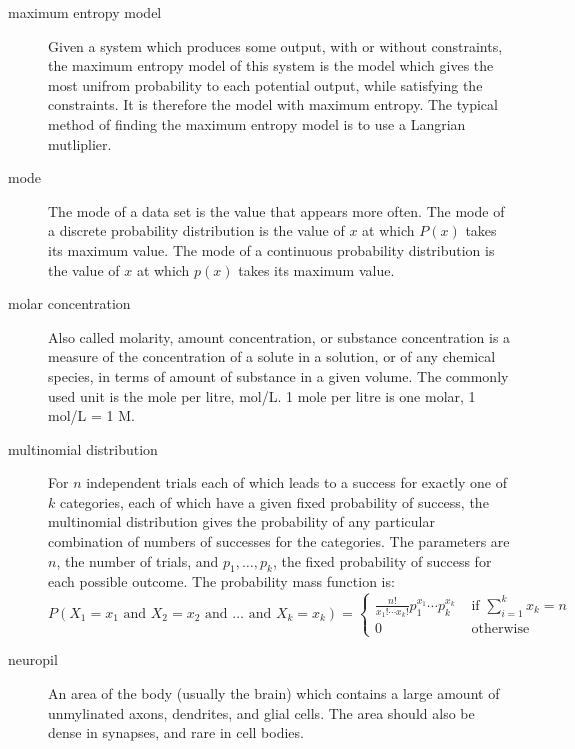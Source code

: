 \documentclass[a4paper,12pt]{article}
\theoremstyle{definition}
\begin{document}
\begin{description}
  \item[maximum entropy model] Given a system which produces some output, with or without constraints, the maximum entropy model of this system is the model which gives the most unifrom probability to each potential output, while satisfying the constraints. It is therefore the model with maximum entropy. The typical method of finding the maximum entropy model is to use a Langrian mutliplier.

  \item[mode] The mode of a data set is the value that appears more often. The mode of a discrete probability distribution is the value of $x$ at which $P(x)$ takes its maximum value. The mode of a continuous probability distribution is the value of $x$ at which $p(x)$ takes its maximum value.

  \item[molar concentration] Also called molarity, amount concentration, or substance concentration is a measure of the concentration of a solute in a solution, or of any chemical species, in terms of amount of substance in a given volume. The commonly used unit is the mole per litre, mol/L. 1 mole per litre is one molar, 1 mol/L = 1 M.

  \item[multinomial distribution] For $n$ independent trials each of which leads to a success for exactly one of $k$ categories, each of which have a given fixed probability of success, the multinomial distribution gives the probability of any particular combination of numbers of successes for the categories. The parameters are $n$, the number of trials, and $p_1, \dots, p_k$, the fixed probability of success for each possible outcome. The probability mass function is:
  \begin{equation}
    P(X_1 = x_1 \text{ and } X_2 = x_2 \text{ and } \dots \text{ and } X_k = x_k) =
      \begin{cases}
        \frac{n!}{x_1!\cdots x_k!}p_1^{x_1}\cdots p_k^{x_k} & \text{ if } \sum_{i=1}^k x_k = n \\
        0 & \text{ otherwise }
      \end{cases}
  \end{equation}

  \item[neuropil] An area of the body (usually the brain) which contains a large amount of unmylinated axons, dendrites, and glial cells. The area should also be dense in synapses, and rare in cell bodies.


\end{description}
\end{document}
